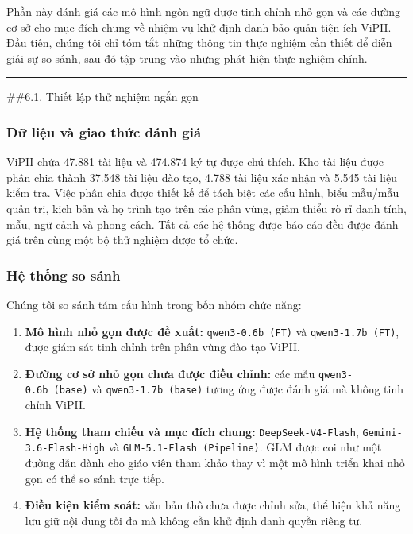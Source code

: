 \documentclass[
  11pt,
  a4paper,
]{article}
\providecommand{\tightlist}{%
  \setlength{\itemsep}{0pt}\setlength{\parskip}{0pt}}
\begin{document}
Phần này đánh giá các mô hình ngôn ngữ được tinh chỉnh nhỏ gọn và các
đường cơ sở cho mục đích chung về nhiệm vụ khử định danh bảo quản tiện
ích ViPII. Đầu tiên, chúng tôi chỉ tóm tắt những thông tin thực nghiệm
cần thiết để diễn giải sự so sánh, sau đó tập trung vào những phát hiện
thực nghiệm chính.

\begin{center}\rule{0.5\linewidth}{0.5pt}\end{center}

\#\#6.1. Thiết lập thử nghiệm ngắn gọn

\subsubsection{Dữ liệu và giao thức đánh
giá}\label{dux1eef-liux1ec7u-vuxe0-giao-thux1ee9c-ux111uxe1nh-giuxe1}

ViPII chứa 47.881 tài liệu và 474.874 ký tự được chú thích. Kho tài liệu
được phân chia thành 37.548 tài liệu đào tạo, 4.788 tài liệu xác nhận và
5.545 tài liệu kiểm tra. Việc phân chia được thiết kế để tách biệt các
cấu hình, biểu mẫu/mẫu quản trị, kịch bản và họ trình tạo trên các phân
vùng, giảm thiểu rò rỉ danh tính, mẫu, ngữ cảnh và phong cách. Tất cả
các hệ thống được báo cáo đều được đánh giá trên cùng một bộ thử nghiệm
được tổ chức.

\subsubsection{Hệ thống so sánh}\label{hux1ec7-thux1ed1ng-so-suxe1nh}

Chúng tôi so sánh tám cấu hình trong bốn nhóm chức năng:

\begin{enumerate}
\def\labelenumi{\arabic{enumi}.}
\tightlist
\item
  \textbf{Mô hình nhỏ gọn được đề xuất:} \texttt{qwen3-0.6b\ (FT)} và
  \texttt{qwen3-1.7b\ (FT)}, được giám sát tinh chỉnh trên phân vùng đào
  tạo ViPII.
\item
  \textbf{Đường cơ sở nhỏ gọn chưa được điều chỉnh:} các mẫu
  \texttt{qwen3-0.6b\ (base)} và \texttt{qwen3-1.7b\ (base)} tương ứng
  được đánh giá mà không tinh chỉnh ViPII.
\item
  \textbf{Hệ thống tham chiếu và mục đích chung:}
  \texttt{DeepSeek-V4-Flash}, \texttt{Gemini-3.6-Flash-High} và
  \texttt{GLM-5.1-Flash\ (Pipeline)}. GLM được coi như một đường dẫn
  dành cho giáo viên tham khảo thay vì một mô hình triển khai nhỏ gọn có
  thể so sánh trực tiếp.
\item
  \textbf{Điều kiện kiểm soát:} văn bản thô chưa được chỉnh sửa, thể
  hiện khả năng lưu giữ nội dung tối đa mà không cần khử định danh quyền
  riêng tư.
\end{enumerate}
\end{document}
